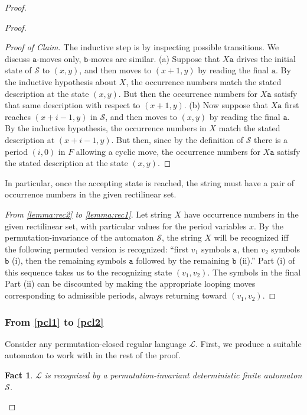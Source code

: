 \documentclass[12pt,oneside,reqno]{amsart}
\newtheorem{fact}{Fact}
\theoremstyle{definition}
\begin{document}
\begin{proof}
\begin{proof}
\begin{proof}[Proof of Claim]
The inductive step is by inspecting  possible transitions. We discuss $\mathtt{a}$-moves only, $\mathtt{b}$-moves are similar. (a) Suppose that $X\mathtt{a}$ drives the initial state of $\mathcal{S}$ to $(x, y)$, and then moves to $(x+1, y)$ by reading the final $\mathtt{a}$. By the inductive hypothesis about $X$, the occurrence numbers  match the stated description at the state $(x, y)$. But then the occurrence numbers for $X\mathtt{a}$ satisfy that same description with respect to $(x+1, y)$. (b) Now suppose that $X\mathtt{a}$ first reaches $(x + i - 1, y)$ in $\mathcal{S}$, and then moves to $(x, y)$ by reading the final $\mathtt{a}$. By the inductive hypothesis, the occurrence numbers in $X$ match the stated description at $(x + i - 1, y)$. But then, since by the definition of $\mathcal{S}$ there is a period $(i, 0)$ in $F$ allowing a cyclic move, the occurrence numbers for $X\mathtt{a}$ satisfy the stated description at the state $(x, y)$. 	\end{proof}

In particular, once the accepting state is reached, the string must have a pair of occurrence numbers in the given rectilinear set.	

\vspace{1ex}

	\emph{From \ref{lemma:rec2} to \ref{lemma:rec1}}. Let string $X$ have occurrence numbers in the given rectilinear set, with particular values for the period variables $x$. By the permutation-invariance of the automaton $\mathcal{S}$, the string $X$ will be recognized iff the following permuted version is recognized: ``first $v_1$ symbols $\mathtt{a}$, then $v_2$ symbols $\mathtt{b}$ (i), then the remaining symbols $\mathtt{a}$ followed by the remaining $\mathtt{b}$ (ii).'' Part (i) of this sequence takes us to the recognizing state $(v_1, v_2)$. The symbols in the final Part (ii) can be discounted by making the appropriate looping moves corresponding to admissible periods, always returning toward $(v_1, v_2)$.    \end{proof} 
	

\subsubsection*{From \ref{pcl1} to \ref{pcl2}}  Consider any permutation-closed regular language $\mathcal{L}$. First, we produce a suitable automaton to work with in the rest of the proof.

\begin{fact}  	 $\mathcal{L}$ is recognized by a permutation-invariant deterministic finite automaton $\mathcal{S}$.
\end{fact}


\end{proof}
\end{document}
